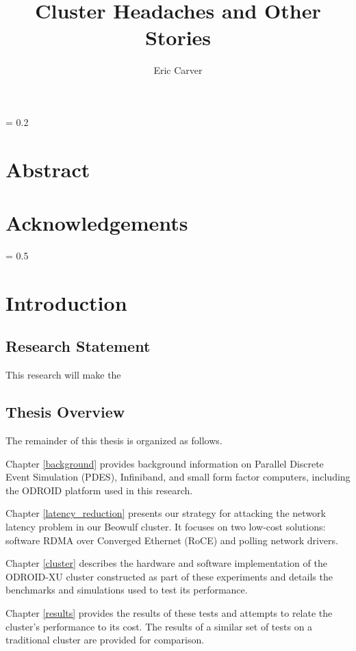 \documentclass[a4paper]{article}
\title{
    \vspace{2in}
    \textbf{Cluster Headaches and Other Stories \\}
    \vspace{2in}
}
\author{Eric Carver}
\affil{carverer@mail.uc.edu}
\affil{(513) 207-6501}
\begin{document}
%
\maketitle
\thispagestyle{empty}
\newpage
\thispagestyle{empty}
\parskip = 0.2\baselineskip
\newpage
\thispagestyle{empty}
\section*{\textbf{Abstract}}
\newpage
\thispagestyle{empty}
\section*{\textbf{Acknowledgements}}
\newpage
\thispagestyle{empty}
\tableofcontents
\newpage
\thispagestyle{empty}
\listoffigures
\listoftables
\parskip = 0.5\baselineskip
\newpage

\section{\textbf{Introduction}}
\label{introduction}

\subsection{\textbf{Research Statement}}

This research will make the 

\subsection{\textbf{Thesis Overview}}

The remainder of this thesis is organized as follows.

Chapter \ref{background} provides background information on Parallel Discrete
Event Simulation (PDES), Infiniband\texttrademark, and small form factor
computers, including the ODROID platform used in this research.

Chapter \ref{latency_reduction} presents our strategy for attacking the network
latency problem in our Beowulf cluster. It focuses on two low-cost solutions:
software RDMA over Converged Ethernet (RoCE) and polling network drivers.

Chapter \ref{cluster} describes the hardware and software implementation of the
ODROID-XU cluster constructed as part of these experiments and details the
benchmarks and simulations used to test its performance.

Chapter \ref{results} provides the results of these tests and attempts to relate
the cluster's performance to its cost. The results of a similar set of tests on
a traditional cluster are provided for comparison.
\end{document}
